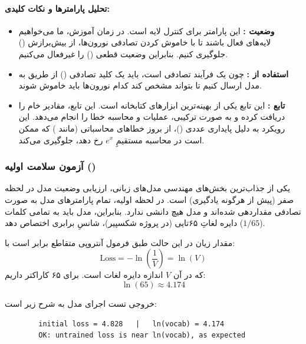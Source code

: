 \documentclass{article}
\begin{document}
\paragraph{تحلیل پارامترها و نکات کلیدی:}
\begin{itemize}
	\item \textbf{وضعیت :} این پارامتر برای کنترل لایه  است. در زمان آموزش، ما می‌خواهیم لایه‌های  فعال باشند تا با خاموش کردن تصادفی نورون‌ها، از بیش‌برازش () جلوگیری کنیم. بنابراین وضعیت قطعی () را غیرفعال می‌کنیم.
	\item \textbf{استفاده از :} چون  یک فرآیند تصادفی است، باید یک کلید تصادفی () از طریق  به مدل ارسال کنیم تا  بتواند مشخص کند کدام نورون‌ها باید خاموش شوند.
	\item \textbf{تابع :} این تابع یکی از بهینه‌ترین ابزارهای کتابخانه  است. این تابع، مقادیر خام  را دریافت کرده و به صورت ترکیبی، عملیات  و محاسبه خطا را انجام می‌دهد. این رویکرد به دلیل پایداری عددی ()، از بروز خطاهای محاسباتی (مانند ) که ممکن است در محاسبه مستقیمِ $e^x$ رخ دهد، جلوگیری می‌کند.
\end{itemize}

\subsubsection*{آزمون سلامت اولیه ()}

یکی از جذاب‌ترین بخش‌های مهندسی مدل‌های زبانی، ارزیابی وضعیت مدل در لحظه صفر (پیش از هرگونه یادگیری) است. در لحظه اولیه، تمام پارامترهای مدل به صورت تصادفی مقداردهی شده‌اند و مدل هیچ دانشی ندارد. بنابراین، مدل باید به تمامی کلمات دایره لغاتِ ۶۵تایی (در پروژه شکسپیر)، شانسِ برابری اختصاص دهد ($1/65$).

مقدار زیان در این حالت طبق فرمول آنتروپی متقاطع برابر است با:
\begin{equation}
	\mathrm{Loss} = -\ln\left(\frac{1}{V}\right) = \ln(V)
\end{equation}
که در آن $V$ اندازه دایره لغات است. برای ۶۵ کاراکتر داریم:
\begin{equation}
	\ln(65) \approx 4.174
\end{equation}

خروجی تست اجرای مدل به شرح زیر است:
\begin{latin}
	\begin{lstlisting}
		initial loss = 4.828   |   ln(vocab) = 4.174
		OK: untrained loss is near ln(vocab), as expected
	\end{lstlisting}
\end{latin}
\end{document}
